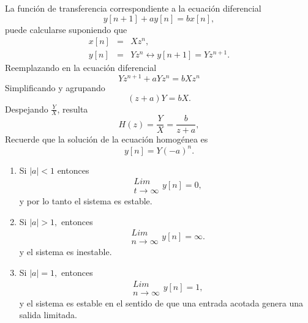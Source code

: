 La funci\'{o}n de transferencia correspondiente a la ecuaci\'{o}n
diferencial 
\begin{equation}
        y\left[ n+1\right] +ay\left[ n\right] =bx\left[ n\right] ,
\end{equation}
puede calcularse suponiendo que 
\begin{eqnarray}
        x\left[ n\right] &=&Xz^n, \\
        y\left[ n\right] &=&Yz^n\longleftrightarrow y\left[ n+1\right] =Yz^{n+1}.
\end{eqnarray}
Reemplazando en la ecuaci\'{o}n diferencial 
\begin{equation}
        Yz^{n+1}+aYz^n=bXz^n
\end{equation}
Simplificando y agrupando 
\begin{equation}
        \left( z+a\right) Y=bX.
\end{equation}
Despejando $\frac{Y}{X}$, resulta 
\begin{equation}
        H\left( z\right) =\frac{Y}{X}=\frac{b}{z+a},
\end{equation}
Recuerde que la soluci\'{o}n de la ecuaci\'{o}n homog\'{e}nea es 
\begin{equation}
        y\left[ n\right] =Y\left( -a\right) ^n.
\end{equation}
\begin{enumerate}
        \item   Si $\left| a\right| < 1$ entonces 
        \begin{equation}
                \begin{array}{c}
                        Lim \\ 
                        t\rightarrow \infty
                \end{array}
                y\left[ n\right] =0,
        \end{equation}
        y por lo tanto el sistema es estable. 
        
        \item   Si $\left| a\right| > 1,$ entonces 
        \begin{equation}
                \begin{array}{c}
                        Lim \\ 
                        n\rightarrow \infty
                \end{array}
                y\left[ n\right] =\infty .
        \end{equation}
        y el sistema es inestable.
        
        \item   Si $\left| a\right| = 1,$ entonces 
        \begin{equation}
                \begin{array}{c}
                        Lim \\ 
                        n\rightarrow \infty
                \end{array}
                y\left[ n\right] = 1,
        \end{equation}
        y el sistema es estable en el sentido de que una entrada acotada genera una salida limitada.
\end{enumerate}

